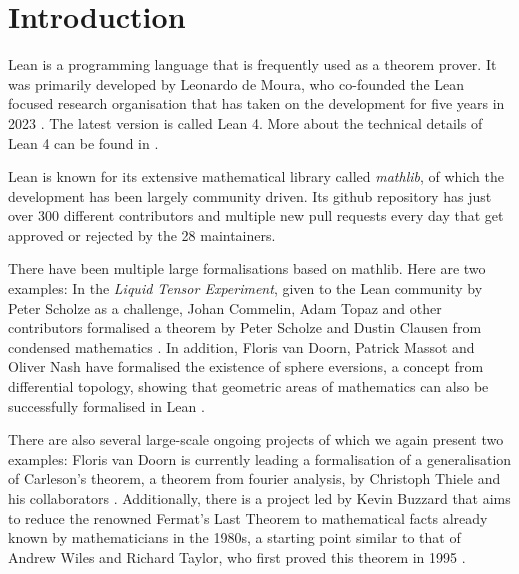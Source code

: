 \chapter*{Introduction}

Lean is a programming language that is frequently used as a theorem prover. 
It was primarily developed by Leonardo de Moura, who co-founded the Lean focused research organisation that has taken on the development for five years in 2023 \cite{LeanFRO2024}. 
The latest version is called Lean 4.
More about the technical details of Lean 4 can be found in \cite{deMoura2021}.

Lean is known for its extensive mathematical library called \emph{mathlib}, of which the development has been largely community driven. 
Its github repository has just over 300 different contributors and multiple new pull requests every day that get approved or rejected by the 28 maintainers. 

There have been multiple large formalisations based on mathlib. 
Here are two examples: 
In the \emph{Liquid Tensor Experiment}, given to the Lean community by Peter Scholze as a challenge, Johan Commelin, Adam Topaz and other contributors formalised a theorem by Peter Scholze and Dustin Clausen from condensed mathematics \cite{Commelin2022}.
In addition, Floris van Doorn, Patrick Massot and Oliver Nash have formalised the existence of sphere eversions, a concept from differential topology, showing that geometric areas of mathematics can also be successfully formalised in Lean \cite{vanDoorn2023}. 

There are also several large-scale ongoing projects of which we again present two examples: 
Floris van Doorn is currently leading a formalisation of a generalisation of Carleson's theorem, a theorem from fourier analysis, by Christoph Thiele and his collaborators \cite{Becker2024}.
Additionally, there is a project led by Kevin Buzzard that aims to reduce the renowned Fermat's Last Theorem to mathematical facts already known by mathematicians in the 1980s, a starting point similar to that of Andrew Wiles and Richard Taylor, who first proved this theorem in 1995 \cite{Buzzard2024}.

